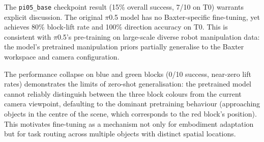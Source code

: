 \documentclass[conference, 12pt]{IEEEtran}
\begin{document}
The \texttt{pi05\_base} checkpoint result (15\% overall success, 7/10 on T0)
warrants explicit discussion.
The original $\pi$0.5 model has no Baxter-specific fine-tuning, yet achieves
80\% block-lift rate and 100\% direction accuracy on T0.
This is consistent with $\pi$0.5's pre-training on large-scale diverse robot
manipulation data: the model's pretrained manipulation priors partially
generalise to the Baxter workspace and camera configuration.

The performance collapse on blue and green blocks (0/10 success, near-zero
lift rates) demonstrates the limits of zero-shot generalisation:
the pretrained model cannot reliably distinguish between the three block colours
from the current camera viewpoint, defaulting to the dominant pretraining
behaviour (approaching objects in the centre of the scene, which corresponds
to the red block's position).
This motivates fine-tuning as a mechanism not only for embodiment adaptation
but for task routing across multiple objects with distinct spatial locations.

\end{document}
